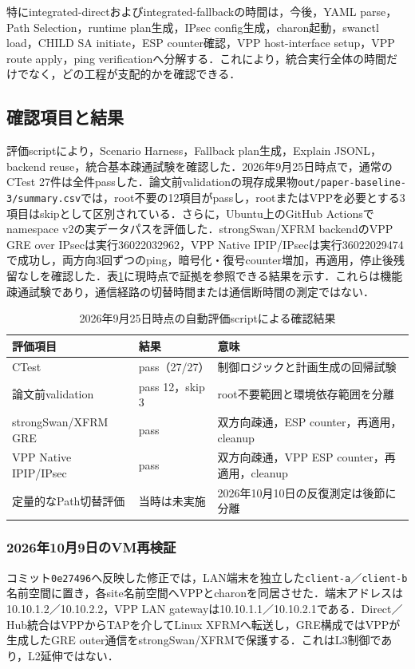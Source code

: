 \documentclass[11pt,a4paper,twoside]{ltjsarticle}
\begin{document}
特にintegrated-directおよびintegrated-fallbackの時間は，今後，YAML parse，Path Selection，runtime plan生成，IPsec config生成，charon起動，swanctl load，CHILD SA initiate，ESP counter確認，VPP host-interface setup，VPP route apply，ping verificationへ分解する．これにより，統合実行全体の時間だけでなく，どの工程が支配的かを確認できる．

\subsection{確認項目と結果}
評価scriptにより，Scenario Harness，Fallback plan生成，Explain JSONL，backend reuse，統合基本疎通試験を確認した．2026年9月25日時点で，通常のCTest 27件は全件passした．論文前validationの現存成果物\texttt{out/paper-baseline-3/summary.csv}では，root不要の12項目がpassし，rootまたはVPPを必要とする3項目はskipとして区別されている．さらに，Ubuntu上のGitHub Actionsでnamespace v2の実データパスを評価した．strongSwan/XFRM backendのVPP GRE over IPsecは実行36022032962，VPP Native IPIP/IPsecは実行36022029474で成功し，両方向3回ずつのping，暗号化・復号counter増加，再適用，停止後残留なしを確認した．表\ref{tab:evaluation}に現時点で証拠を参照できる結果を示す．これらは機能疎通試験であり，通信経路の切替時間または通信断時間の測定ではない．

\begin{table}[h]
\centering
\caption{2026年9月25日時点の自動評価scriptによる確認結果}
\label{tab:evaluation}
\begin{tabular}{lll}
\toprule
評価項目 & 結果 & 意味 \\
\midrule
CTest & pass（27/27） & 制御ロジックと計画生成の回帰試験 \\
論文前validation & pass 12，skip 3 & root不要範囲と環境依存範囲を分離 \\
strongSwan/XFRM GRE & pass & 双方向疎通，ESP counter，再適用，cleanup \\
VPP Native IPIP/IPsec & pass & 双方向疎通，VPP ESP counter，再適用，cleanup \\
定量的なPath切替評価 & 当時は未実施 & 2026年10月10日の反復測定は後節に分離 \\
\bottomrule
\end{tabular}
\end{table}

\subsubsection{2026年10月9日のVM再検証}
コミット\texttt{0e27496}へ反映した修正では，LAN端末を独立した\texttt{client-a}／\texttt{client-b}名前空間に置き，各site名前空間へVPPとcharonを同居させた．端末アドレスは10.10.1.2／10.10.2.2，VPP LAN gatewayは10.10.1.1／10.10.2.1である．Direct／Hub統合はVPPからTAPを介してLinux XFRMへ転送し，GRE構成ではVPPが生成したGRE outer通信をstrongSwan/XFRMで保護する．これはL3制御であり，L2延伸ではない．
\end{document}
